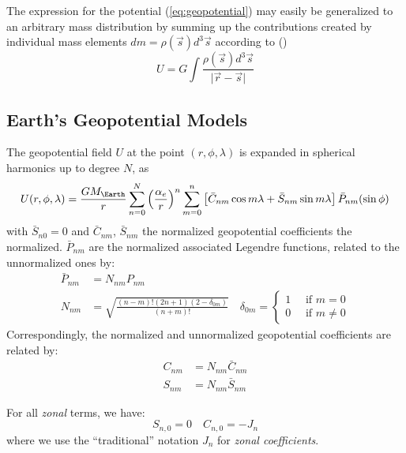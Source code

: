 The expression for the potential (\ref{eq:geopotential}) may easily be 
generalized to an arbitrary mass distribution by summing up the contributions 
created by individual mass elements
\(dm = \rho(\vec{s}) d^3 \vec{s}\) according to (\cite{Montenbruck2000})
\begin{equation}
    U = G \int{\frac{\rho(\vec{s}) d^3 \vec{s}}{\lvert \vec{r} - \vec{s} \rvert}}
\end{equation}


\subsection{Earth's Geopotential Models}
The geopotential field $U$ at the point $(r, \phi , \lambda )$ is expanded in 
spherical harmonics up to degree $N$, as
\begin{equation}
  \label{eq:iers201061}
  U(r, \phi , \lambda ) = \frac{G M_{\Earth}}{r} \sum_{n=0}^N 
    {\left(\frac{\alpha _e}{r}\right)}^n 
     \sum_{m=0}^n \left[ \bar{C}_{nm} \cos {m \lambda} + \bar{S}_{nm} \sin{m \lambda} \right] 
     \bar{P}_{nm}( \sin \phi )
\end{equation}
with $\bar{S}_{n0} = 0$ and $\bar{C}_{nm}$, $\bar{S}_{nm}$ the normalized 
geopotential coefficients the normalized. $\bar{P}_{nm}$ are the normalized 
associated Legendre functions, related to the unnormalized ones by:
\begin{subequations}
  \begin{align}
    \bar{P}_{nm} &= N_{nm} P_{nm} \label{eq:iers201062a} \\
    N_{nm} &= \sqrt{\frac{(n-m)!(2n+1)(2-\delta _{0m})}{(n+m)!}} 
      \quad \delta _{0m} = 
        \begin{cases}
          1 \quad \text{ if } m = 0 \\
          0 \quad \text{ if } m \neq 0
        \end{cases}
        \label{eq:iers201062b}
  \end{align}
\end{subequations}
Correspondingly, the normalized and unnormalized geopotential coefficients are 
related by:
\begin{subequations}
  \begin{align}
    C_{nm} &= N_{nm} \bar{C}_{nm} \\
    S_{nm} &= N_{nm} \bar{S}_{nm}
  \end{align}
\end{subequations}

For all \emph{zonal} terms, we have:
\begin{equation}
  S_{n,0} = 0 \quad C_{n,0} = -J_n
\end{equation}
where we use the ``traditional'' notation $J_n$ for \emph{zonal coefficients}.


